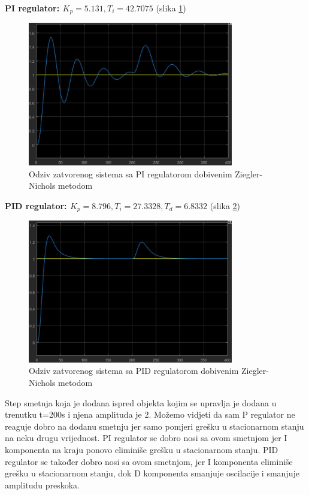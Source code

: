 \textbf{PI regulator: $K_p=5.131, T_i=42.7075$} (slika \ref{fig:z2_26})

\begin{figure} [H]
  \centering
  \includegraphics[width=0.8\textwidth]{z2_26}
  \caption{Odziv zatvorenog sistema sa PI regulatorom dobivenim Ziegler-Nichols metodom}
  \label{fig:z2_26}
\end{figure}

\textbf{PID regulator: $K_p=8.796, T_i=27.3328, T_d=6.8332$} (slika \ref{fig:z2_27})

\begin{figure} [H]
  \centering
  \includegraphics[width=0.8\textwidth]{z2_27}
  \caption{Odziv zatvorenog sistema sa PID regulatorom dobivenim Ziegler-Nichols metodom}
  \label{fig:z2_27}
\end{figure}

Step smetnja koja je dodana ispred objekta kojim se upravlja je dodana u trenutku t=200s i njena amplituda je 2. Možemo vidjeti da sam P regulator ne reaguje dobro na dodanu smetnju jer samo pomjeri grešku u stacionarnom stanju na neku drugu vrijednost. PI regulator se dobro nosi sa ovom smetnjom jer I komponenta na kraju ponovo eliminiše grešku u stacionarnom stanju. PID regulator se također dobro nosi sa ovom smetnjom, jer I komponenta eliminiše grešku u stacionarnom stanju, dok D komponenta smanjuje oscilacije i smanjuje amplitudu preskoka.
























